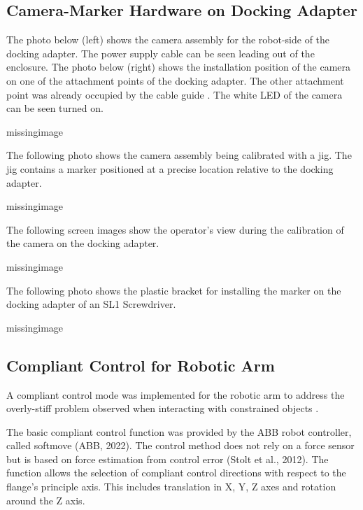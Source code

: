 \subsection{Camera-Marker Hardware on Docking Adapter}
\label{subsection:exploration_4_camera_marker_hardware_on_docking_adapter}

The photo below (left) shows the camera assembly for the robot-side of the docking adapter. The power supply cable can be seen leading out of the enclosure. The photo below (right) shows the installation position of the camera on one of the attachment points of the docking adapter. The other attachment point was already occupied by the cable guide . The white LED of the camera can be seen turned on.

missingimage

The following photo shows the camera assembly being calibrated with a jig. The jig contains a marker positioned at a precise location relative to the docking adapter.

missingimage

The following screen images show the operator’s view during the calibration of the camera on the docking adapter.

missingimage

The following photo shows the plastic bracket for installing the marker on the docking adapter of an SL1 Screwdriver. 

missingimage

\subsection{Compliant Control for Robotic Arm}
\label{subsection:exploration_4_compliant_control_for_robotic_arm}

A compliant control mode was implemented for the robotic arm to address the overly-stiff problem observed when interacting with constrained objects .

The basic compliant control function was provided by the ABB robot controller, called softmove (ABB, 2022). The control method does not rely on a force sensor but is based on force estimation from control error (Stolt et al., 2012). The function allows the selection of compliant control directions with respect to the flange’s principle axis. This includes translation in X, Y, Z axes and rotation around the Z axis. 

